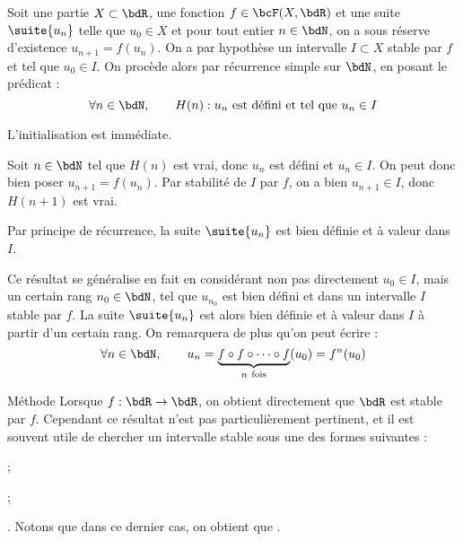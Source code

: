 \documentclass[a4paper,french,bookmarks]{article}
\begin{document}
\begin{nproof}
    Soit une partie $X \subset \bdR$, une fonction $f \in \bcF(X, \bdR)$ et une suite $\suite{u_n}$ telle que $u_0 \in X$ et pour tout entier $n \in \bdN$, on a sous réserve d'existence $u_{n+1} = f\left(u_n\right)$. On a par hypothèse un intervalle $I \subset X$ stable par $f$ et tel que $u_0 \in I$. On procède alors par récurrence simple sur $\bdN$, en posant le prédicat :
    \[ \forall n \in \bdN,\qquad H(n) : u_n \ \text{est défini et tel que} \ u_n \in I\]
    
    \begin{enumerate}
        \itt L'initialisation est immédiate.
        
        \itt Soit $n \in \bdN$ tel que $H(n)$ est vrai, donc $u_n$ est défini et $u_n \in I$. On peut donc bien poser $u_{n+1} = f\left(u_n\right)$. Par stabilité de $I$ par $f$, on a bien $u_{n+1} \in I$, donc $H(n+1)$ est vrai.
        
        \itt Par principe de récurrence, la suite $\suite{u_n}$ est bien définie et à valeur dans $I$.
    \end{enumerate}
\end{nproof}

Ce résultat se généralise en fait en considérant non pas directement $u_0 \in I$, mais un certain rang $n_0 \in \bdN$, tel que $u_{n_0}$ est bien défini et dans un intervalle $I$ stable par $f$. La suite $\suite{u_n}$ est alors bien définie et à valeur dans $I$ à partir d'un certain rang. On remarquera de plus qu'on peut écrire :
%
\[ \forall n \in \bdN,\qquad u_n = \underbrace{f \circ f \circ \dots \circ f}_{n \ \text{fois}}(u_0) = f^n(u_0)\]

\begin{form}{Méthode}{}
    Lorsque $f : \bdR \to \bdR$, on obtient directement que $\bdR$ est stable par $f$. Cependant ce résultat n'est pas particulièrement pertinent, et il est souvent utile de chercher un intervalle stable sous une des formes suivantes :
    
    \begin{enumerate}
        \begin{minipage}{0.5\linewidth}
            \ithand \hg{un intervalle minoré $[M, +\infty[$} ;
        \end{minipage}
        \begin{minipage}{0.5\linewidth}
            \ithand \hg{un intervalle majoré $]-\infty, m]$} ;
        \end{minipage}
        
        \ithand {}. Notons que dans ce dernier cas, on obtient que .
    \end{enumerate}
\end{form}
\end{document}
